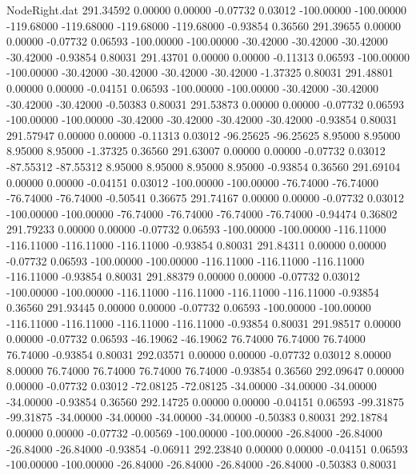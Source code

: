 \begin{filecontents}{NodeRight.dat}
 291.34592    0.00000    0.00000    -0.07732    0.03012 -100.00000 -100.00000 -119.68000 -119.68000 -119.68000 -119.68000   -0.93854    0.36560
 291.39655    0.00000    0.00000    -0.07732    0.06593 -100.00000 -100.00000  -30.42000  -30.42000  -30.42000  -30.42000   -0.93854    0.80031
 291.43701    0.00000    0.00000    -0.11313    0.06593 -100.00000 -100.00000  -30.42000  -30.42000  -30.42000  -30.42000   -1.37325    0.80031
 291.48801    0.00000    0.00000    -0.04151    0.06593 -100.00000 -100.00000  -30.42000  -30.42000  -30.42000  -30.42000   -0.50383    0.80031
 291.53873    0.00000    0.00000    -0.07732    0.06593 -100.00000 -100.00000  -30.42000  -30.42000  -30.42000  -30.42000   -0.93854    0.80031
 291.57947    0.00000    0.00000    -0.11313    0.03012  -96.25625  -96.25625    8.95000    8.95000    8.95000    8.95000   -1.37325    0.36560
 291.63007    0.00000    0.00000    -0.07732    0.03012  -87.55312  -87.55312    8.95000    8.95000    8.95000    8.95000   -0.93854    0.36560
 291.69104    0.00000    0.00000    -0.04151    0.03012 -100.00000 -100.00000  -76.74000  -76.74000  -76.74000  -76.74000   -0.50541    0.36675
 291.74167    0.00000    0.00000    -0.07732    0.03012 -100.00000 -100.00000  -76.74000  -76.74000  -76.74000  -76.74000   -0.94474    0.36802
 291.79233    0.00000    0.00000    -0.07732    0.06593 -100.00000 -100.00000 -116.11000 -116.11000 -116.11000 -116.11000   -0.93854    0.80031
 291.84311    0.00000    0.00000    -0.07732    0.06593 -100.00000 -100.00000 -116.11000 -116.11000 -116.11000 -116.11000   -0.93854    0.80031
 291.88379    0.00000    0.00000    -0.07732    0.03012 -100.00000 -100.00000 -116.11000 -116.11000 -116.11000 -116.11000   -0.93854    0.36560
 291.93445    0.00000    0.00000    -0.07732    0.06593 -100.00000 -100.00000 -116.11000 -116.11000 -116.11000 -116.11000   -0.93854    0.80031
 291.98517    0.00000    0.00000    -0.07732    0.06593  -46.19062  -46.19062   76.74000   76.74000   76.74000   76.74000   -0.93854    0.80031
 292.03571    0.00000    0.00000    -0.07732    0.03012    8.00000    8.00000   76.74000   76.74000   76.74000   76.74000   -0.93854    0.36560
 292.09647    0.00000    0.00000    -0.07732    0.03012  -72.08125  -72.08125  -34.00000  -34.00000  -34.00000  -34.00000   -0.93854    0.36560
 292.14725    0.00000    0.00000    -0.04151    0.06593  -99.31875  -99.31875  -34.00000  -34.00000  -34.00000  -34.00000   -0.50383    0.80031
 292.18784    0.00000    0.00000    -0.07732   -0.00569 -100.00000 -100.00000  -26.84000  -26.84000  -26.84000  -26.84000   -0.93854   -0.06911
 292.23840    0.00000    0.00000    -0.04151    0.06593 -100.00000 -100.00000  -26.84000  -26.84000  -26.84000  -26.84000   -0.50383    0.80031

\end{filecontents}
